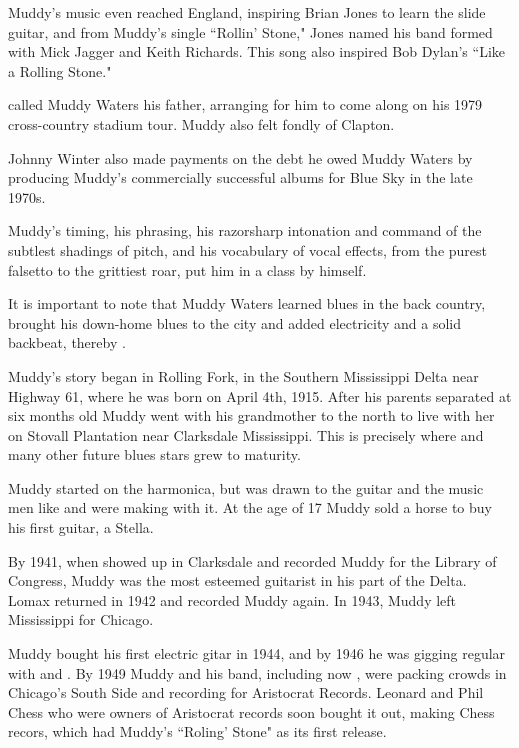 \documentclass[12pt, a4paper, twoside, openright, titlepage]{book}
\begin{document}
Muddy's music even reached England, inspiring Brian Jones to learn the slide guitar, and from Muddy's single ``Rollin' Stone," Jones named his band formed with Mick Jagger and Keith Richards. This song also inspired Bob Dylan's ``Like a Rolling Stone."


\begin{rmk}{}{}
     called Muddy Waters his father, arranging for him to come along on his 1979 cross-country stadium tour. Muddy also felt fondly of Clapton.
\end{rmk}

Johnny Winter also made payments on the debt he owed Muddy Waters by producing Muddy's commercially successful albums for Blue Sky in the late 1970s. 

\begin{note}{}{}
    Muddy's timing, his phrasing, his razorsharp intonation and command of the subtlest shadings of pitch, and his vocabulary of vocal effects, from the purest falsetto to the grittiest roar, put him in a class by himself.
\end{note}

\begin{rmk}{}{}
    It is important to note that Muddy Waters learned blues in the back country, brought his down-home blues to the city and added electricity and a solid backbeat, thereby . 
\end{rmk}

Muddy's story began in Rolling Fork, in the Southern Mississippi Delta near Highway 61, where he was born on April 4th, 1915. After his parents separated at six months old Muddy went with his grandmother to the north to live with her on Stovall Plantation near Clarksdale Mississippi. This is precisely where  and many other future blues stars grew to maturity.


Muddy started on the harmonica, but was drawn to the guitar and the music men like  and  were making with it. At the age of 17 Muddy sold a horse to buy his first guitar, a Stella.


By 1941, when  showed up in Clarksdale and recorded Muddy for the Library of Congress, Muddy was the most esteemed guitarist in his part of the Delta. Lomax returned in 1942 and recorded Muddy again. In 1943, Muddy left Mississippi for Chicago.


Muddy bought his first electric gitar in 1944, and by 1946 he was gigging regular with  and . By 1949 Muddy and his band, including now , were packing crowds in Chicago's South Side and recording for Aristocrat Records. Leonard and Phil Chess who were owners of Aristocrat records soon bought it out, making Chess recors, which had Muddy's ``Roling' Stone" as its first release.
\end{document}
